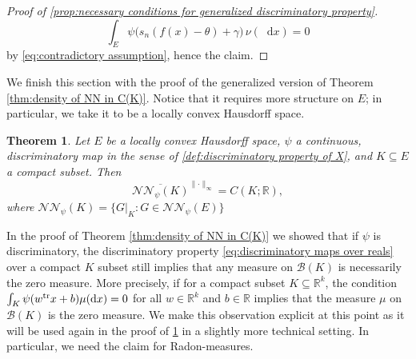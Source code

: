 \documentclass[11pt,a4paper,twoside,openany]{report}
\numberwithin{equation}{section}
\newcommand{\diff}{\mathop{}\!\mathrm{d}}
\theoremstyle{plain} %
\newtheorem{theorem}{Theorem}[section]
\theoremstyle{definition} %
\theoremstyle{remark} %
\begin{document}
\begin{proof}[Proof of \ref{prop:necessary conditions for generalized discriminatory property}]
        \begin{equation*}
            \int_E\psi\big(s_n(f(x)-\theta)+\gamma\big)\,\nu(\diff x)=0
        \end{equation*}
        by \eqref{eq:contradictory assumption}, hence the claim.
\end{proof}


We finish this section with the proof of the generalized version of Theorem \ref{thm:density of NN in C(K)}. Notice that it requires more structure on \(E\); in particular, we take it to be a locally convex Hausdorff space. 
\begin{theorem}\label{thm:density of NN in C(K) generalized}
    Let \(E\) be a locally convex Hausdorff space, \(\psi\) a continuous, discriminatory map in the sense of \ref{def:discriminatory property of X}, and \(K\subseteq E\) a compact subset. Then
    \begin{equation*}
       \overline{\mathcal{NN}_{\psi}(K)}^{\lVert\cdot\rVert_{\infty}}=C(K;\mathbb{R}),
    \end{equation*}
    where \(\mathcal{NN}_{\psi}(K)=\{G|_K:G\in\mathcal{NN}_{\psi}(E)\}\)
\end{theorem}
In the proof of Theorem \ref{thm:density of NN in C(K)} we showed that if \(\psi\) is discriminatory, the discriminatory property \eqref{eq:discriminatory maps over reals} over a compact \(K\) subset still implies that any measure on \(\mathcal{B}(K)\) is necessarily the zero measure. More precisely, if for a compact subset \(K\subseteq\mathbb{R}^k\), the condition
\(\int_K\psi(w^{\rm{tr}}x+b)\mu(\diff x)=0\) for all \(w\in\mathbb{R}^k\) and \(b\in \mathbb{R}\) implies that the measure \(\mu\) on \(\mathcal{B}(K)\) is the zero measure. We make this observation explicit at this point as it will be used again in the proof of \ref{thm:density of NN in C(K) generalized} in a slightly more technical setting. In particular, we need the claim for Radon-measures. 
\end{document}
